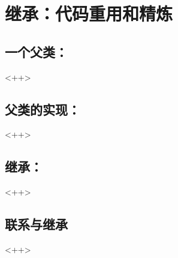 

\chapter{继承：代码重用和精炼}
\label{ch:Inheritance}

\section{一个父类：}<++>

\section{父类的实现：}<++>

\section{继承：}<++>

\section{联系与继承}<++>

